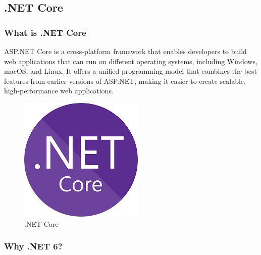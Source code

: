 \documentclass[
12pt,
oneside, 
onehalfspacing, 
nolistspacing, 
parskip, 
chapterinoneline, 
]{AASTCOMPUTER}
\begin{document}
\subsection{.NET Core}
\subsubsection{What is .NET Core}

ASP.NET Core is a cross-platform framework that enables developers to build web applications that can run on different operating systems, including Windows, macOS, and Linux. It offers a unified programming model that combines the best features from earlier versions of ASP.NET, making it easier to create scalable, high-performance web applications.

\begin{figure}[!ht]
	\centering
	\includegraphics[scale=0.5]{Figures/Backend/asp-net-core.png}
  	\caption{.NET Core}
  	\label{fig:.NET Core}
\end{figure}

\subsubsection{Why .NET 6?}
\end{document}
